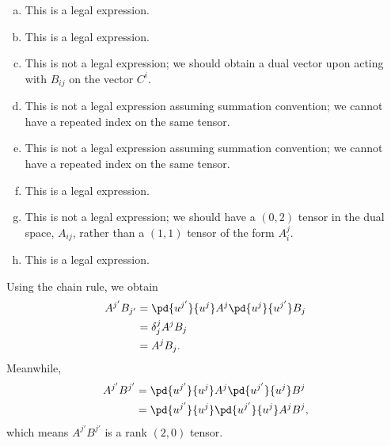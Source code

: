 \documentclass[10pt]{mypackage}
\begin{document}
\RaggedRight
\begin{solution}[30.1]
  \begin{enumerate}[(a)]
    \item This is a legal expression.
    \item This is a legal expression.
    \item This is not a legal expression; we should obtain a dual vector upon acting with $B_{ij}$ on the vector $C^{i}$.
    \item This is not a legal expression assuming summation convention; we cannot have a repeated index on the same tensor.
    \item This is not a legal expression assuming summation convention; we cannot have a repeated index on the same tensor.
    \item This is a legal expression.
    \item This is not a legal expression; we should have a $(0,2)$ tensor in the dual space, $A_{ij}$, rather than a $(1,1)$ tensor of the form $A_{i}^{j}$.
    \item This is a legal expression.
  \end{enumerate}
\end{solution}
\begin{solution}[30.3]
  Using the chain rule, we obtain
  \begin{align*}
    A^{j'}B_{j'} &= \pd{u^{j'}}{u^{j}}A^{j}\pd{u^{j}}{u^{j'}}B_{j}\\
                 &= \delta_{j}^{j}A^jB_j\\
                 &= A^jB_j.
  \end{align*}
  Meanwhile,
  \begin{align*}
    A^{j'}B^{j'} &= \pd{u^{j'}}{u^{j}}A^{j}\pd{u^{j'}}{u^{j}}B^{j}\\
                 &= \pd{u^{j'}}{u^{j}}\pd{u^{j'}}{u^{j}}A^{j}B^{j},
  \end{align*}
  which means $A^{j'}B^{j'}$ is a rank $(2,0)$ tensor.
\end{solution}
\end{document}
